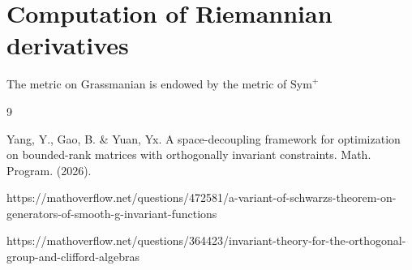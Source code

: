 \documentclass[]{note}
\begin{document}
\section{Computation of Riemannian derivatives}
The metric on Grassmanian is endowed by the metric of $\mathrm{{Sym}}^+$ 

\begin{thebibliography}{9}

 Yang, Y., Gao, B. \& Yuan, Yx. A space-decoupling framework for optimization on bounded-rank matrices with orthogonally invariant constraints. Math. Program. (2026).

 https://mathoverflow.net/questions/472581/a-variant-of-schwarzs-theorem-on-generators-of-smooth-g-invariant-functions

 https://mathoverflow.net/questions/364423/invariant-theory-for-the-orthogonal-group-and-clifford-algebras
\end{thebibliography}
\end{document}
